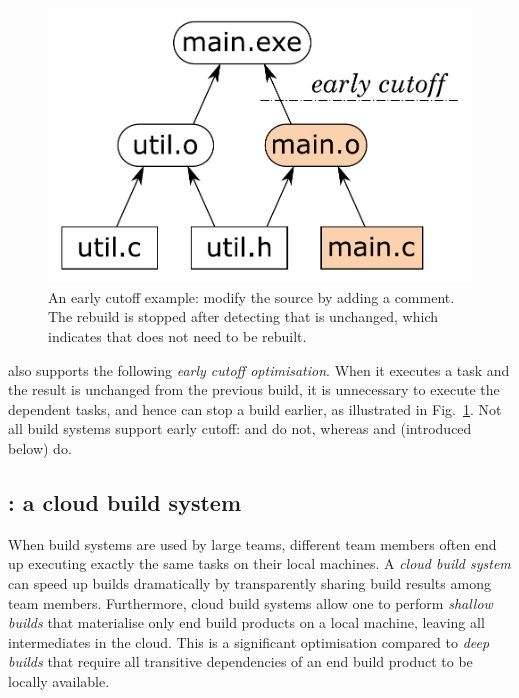 \begin{figure}[h]
\centerline{\includegraphics[scale=0.28]{fig/make-example-cutoff.pdf}}
\vspace{-2mm}
\caption{An early cutoff example: modify the source  by adding a
comment. The rebuild is stopped after detecting that  is unchanged,
which indicates that  does not need to be rebuilt.\label{fig-cutoff}}
\end{figure}

\Shake also supports the following \emph{early cutoff optimisation}. When it
executes a task and the result is unchanged from the previous build, it is
unnecessary to execute the dependent tasks, and hence \Shake can stop a build
earlier, as illustrated in Fig.~\ref{fig-cutoff}. Not all build systems support
early cutoff: \Make and \Excel do not, whereas \Shake and \Bazel (introduced
below) do.

\subsection{\Bazel: a cloud build system}
\label{sec-background-bazel}

When build systems are used by large teams, different team members
often end up executing exactly the same tasks on their local machines.
A \emph{cloud build system} can speed up builds dramatically by
transparently sharing build results among team members. Furthermore, cloud
build systems allow one to perform \emph{shallow builds} that materialise
only end build products on a local machine, leaving all intermediates in the
cloud. This is a significant optimisation compared to \emph{deep builds}
that require all transitive dependencies of an end build product to be
locally available. %

